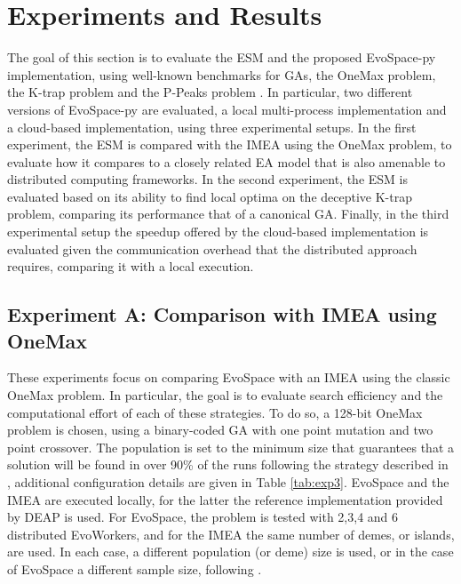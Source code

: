\section{Experiments and Results}
\label{sec:exp1}
The goal of this section is to evaluate the ESM and the proposed EvoSpace-py implementation, using well-known benchmarks for GAs,
the OneMax problem, %
the K-trap problem \cite{trap} and the P-Peaks problem \cite{Jong:PS97}.
In particular, two different versions of EvoSpace-py are evaluated, a local multi-process implementation and a cloud-based implementation,
using three experimental setups.
In the first experiment, the ESM is compared with the IMEA using the OneMax problem, to evaluate how it compares to a closely related EA model that is also
amenable to distributed computing frameworks.
In the second experiment, the ESM is evaluated based on its ability to find local optima on the deceptive K-trap problem,
comparing its performance that of a canonical GA.
Finally, in the third experimental setup the speedup offered by the cloud-based implementation is evaluated given the communication overhead
that the distributed approach requires, comparing it with a local execution.


\subsection{Experiment A: Comparison with IMEA using OneMax}
These experiments focus on comparing EvoSpace with an IMEA using the classic OneMax problem.
In particular, the goal is to evaluate search efficiency and the computational effort of each of these strategies.
To do so, a 128-bit OneMax problem is chosen, %
using a binary-coded GA with one point mutation and two point crossover.
The population is set to the minimum size that guarantees that
a solution will be found in over 90\% of the runs following the strategy described in \cite{nodeo},
additional configuration details are given in Table \ref{tab:exp3}.
EvoSpace and the IMEA are executed locally, for the latter the reference implementation provided by DEAP is used.
For EvoSpace, the problem is tested with 2,3,4 and 6 distributed EvoWorkers,
and for the IMEA the same number of demes, or islands, are used. In each case, a different population (or deme) size is used, or in 
the case of EvoSpace a different sample size, following \cite{nodeo}.

